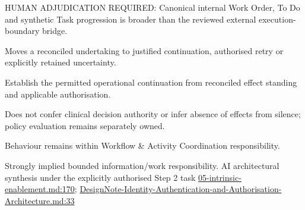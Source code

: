 HUMAN ADJUDICATION REQUIRED: Canonical internal Work Order, To Do and synthetic Task progression is broader than the reviewed external execution-boundary bridge.



Moves a reconciled undertaking to justified continuation, authorised retry or explicitly retained uncertainty.



Establish the permitted operational continuation from reconciled effect standing and applicable authorisation.



Does not confer clinical decision authority or infer absence of effects from silence; policy evaluation remains separately owned.



Behaviour remains within Workflow \& Activity Coordination responsibility.


Strongly implied bounded information/work responsibility. AI architectural synthesis under the explicitly authorised Step 2 task \hyperref[evidence:d70bf9b0b197558f]{05-intrinsic-enablement.md:170}; \hyperref[evidence:13afd583ac468df7]{DesignNote-Identity-Authentication-and-Authorisation-Architecture.md:33}
